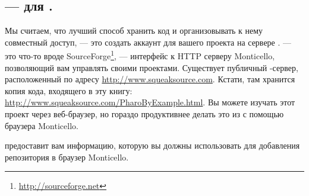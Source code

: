 \documentclass[a4paper,10pt,twoside]{book}
\begin{document}


\subsection{\ind{\sqsrc} ---  для \pharo.} 
Мы считаем, что лучший способ хранить код и организовывать к нему совместный доступ, --- это создать аккаунт для вашего проекта на сервере \sqsrc.
\sqsrc --- это что-то вроде SourceForge\footnote{\url{http://sourceforge.net}}, --- интерфейс к HTTP серверу Monticello, позволяющий вам управлять своими проектами.
Существует публичный \sqsrc-сервер, расположенный по адресу \url{http://www.squeaksource.com}. Кстати, там хранится копия кода, входящего в эту книгу: \url{http://www.squeaksource.com/PharoByExample.html}. Вы можете изучать этот проект через веб-браузер, но гораздо продуктивнее делать это из \pharo с помощью браузера Monticello.

\dothis{Откройте в веб-браузере страницу \url{http://www.squeaksource.com}.
Создайте собственный аккаунт, и зарегистрируйте проект для нашей игры Lights Out.}
\sqsrc предоставит вам информацию, которую вы должны использовать для добавления репозитория в браузер Monticello.
\end{document}
